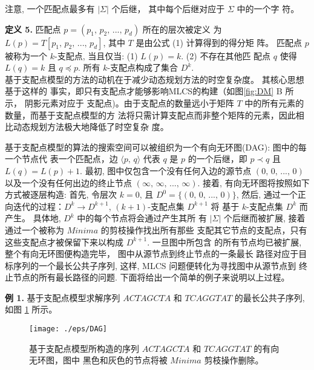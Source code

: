\documentclass[utf8]{frontiersSCNS} %
\begin{document}
注意, 一个匹配点最多有 $|\Sigma|$ 个后继， 其中每个后继对应于 $\Sigma$ 中的一个字
符。

\textbf{定义 5.} 匹配点 $p = (p_1,\, p_2,\, ...,\, p_d)$ 所在的层次被定义
为 $L(p) = T[p_1,\, p_2,\, ...,\, p_d]$, 其中 $T$ 是由公式 (1) 计算得到的得分矩
阵。 匹配点 $p$ 被称为一个 $k$-支配点, 当且仅当: (1) $L(p) = k$. (2) 不存在其他匹
配点 $q$ 使得 $L(q) = k$ 且 $q \preceq p$. 所有 $k$-支配点构成了集合 $D^k$.\\

基于支配点模型的方法的动机在于减少动态规划方法的时空复杂度。 其核心思想基于这样的
事实，即只有支配点才能够影响MLCS的构建（如图\ref{fig:DM} B 所示， 阴影元素对应于
支配点)。由于支配点的数量远小于矩阵 $T$ 中的所有元素的数量，而基于支配点模型的方
法将只需计算支配点而非整个矩阵的元素，因此相比动态规划方法极大地降低了时空复杂
度。

基于支配点模型的算法的搜索空间可以被组织为一个有向无环图(DAG): 图中的每一个节点代
表一个匹配点，边 $\langle p,\, q \rangle$ 代表 $q$ 是 $p$ 的一个后继，即 $p
\prec q$ 且 $L(q) = L(p) + 1$. 最初, 图中仅包含一个没有任何入边的源节点 $(0,\,
0,\, ...,\, 0)$ 以及一个没有任何出边的终止节点 $(\infty,\, \infty,\, ...,\,
\infty)$. 接着, 有向无环图将按照如下方式被逐层构造: 首先, 令层次 $k =
0$, 且 $D^0 = \{(0,\, 0,\, ...,\, 0)\}$, 然后,
通过一个正向迭代的过程：$D^k \rightarrow D^{k+1}$, $(k+1)$-支配点集 $D^{k+1}$ 将
基于 $k$-支配点集 $D^k$ 而产生。 具体地, $D^k$ 中的每个节点将会通过产生其所
有 $|\Sigma|$ 个后继而被扩展, 接着通过一个被称为 $Minima$ 的剪枝操作找出所有那些
支配其它节点的支配点，只有这些支配点才被保留下来以构成 $D^{k+1}$. 一旦图中所包含
的所有节点均已被扩展, 整个有向无环图便构造完毕， 图中从源节点到终止节点的一条最长
路径对应于目标序列的一个最长公共子序列, 这样, MLCS 问题便转化为寻找图中从源节点到
终止节点的所有最长路径的问题. 下面将给出一个简单的例子来说明以上过程。

\textbf{例 1.} 基于支配点模型求解序列 $ACTAGCTA$ 和 $TCAGGTAT$ 的最长公共子序列,
如图 \ref{fig:DAG} 所示。

\begin{figure}[!h]
  \centering
  \texttt{[image: ./eps/DAG]}
  \caption{基于支配点模型所构造的序列 $ACTAGCTA$ 和 $TCAGGTAT$ 的有向无环图，图中
    黑色和灰色的节点将被 $Minima$ 剪枝操作删除。}
  \label{fig:DAG}
\end{figure}
\end{document}

